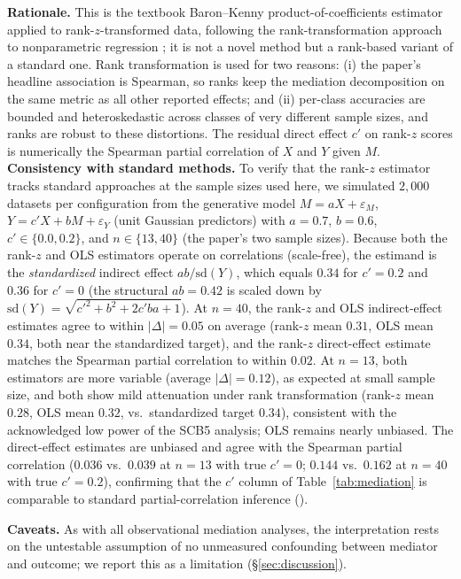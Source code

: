 \documentclass[a4paper,fleqn]{cas-sc}
\begin{document}
\textbf{Rationale.}
This is the textbook Baron--Kenny product-of-coefficients estimator \cite{baron1986moderator, mackinnon2002comparison} applied to rank-$z$-transformed data, following the rank-transformation approach to nonparametric regression \cite{conover1981rank}; it is not a novel method but a rank-based variant of a standard one. Rank transformation is used for two reasons: (i) the paper's headline association is Spearman, so ranks keep the mediation decomposition on the same metric as all other reported effects; and (ii) per-class accuracies are bounded and heteroskedastic across classes of very different sample sizes, and ranks are robust to these distortions. The residual direct effect $c'$ on rank-$z$ scores is numerically the Spearman partial correlation of $X$ and $Y$ given $M$.
\textbf{Consistency with standard methods.}
To verify that the rank-$z$ estimator tracks standard approaches at the sample sizes used here, we simulated $2{,}000$ datasets per configuration from the generative model $M = aX + \varepsilon_M$, $Y = c'X + bM + \varepsilon_Y$ (unit Gaussian predictors) with $a=0.7$, $b=0.6$, $c'\in\{0.0,0.2\}$, and $n\in\{13,40\}$ (the paper's two sample sizes). Because both the rank-$z$ and OLS estimators operate on correlations (scale-free), the estimand is the \emph{standardized} indirect effect $a b/\mathrm{sd}(Y)$, which equals $0.34$ for $c'=0.2$ and $0.36$ for $c'=0$ (the structural $a b=0.42$ is scaled down by $\mathrm{sd}(Y)=\sqrt{c'^2+b^2+2c'ba+1}$). At $n=40$, the rank-$z$ and OLS indirect-effect estimates agree to within $|\Delta|=0.05$ on average (rank-$z$ mean $0.31$, OLS mean $0.34$, both near the standardized target), and the rank-$z$ direct-effect estimate matches the Spearman partial correlation to within $0.02$. At $n=13$, both estimators are more variable (average $|\Delta|=0.12$), as expected at small sample size, and both show mild attenuation under rank transformation (rank-$z$ mean $0.28$, OLS mean $0.32$, vs.\ standardized target $0.34$), consistent with the acknowledged low power of the SCB5 analysis; OLS remains nearly unbiased. The direct-effect estimates are unbiased and agree with the Spearman partial correlation ($0.036$ vs.\ $0.039$ at $n=13$ with true $c'=0$; $0.144$ vs.\ $0.162$ at $n=40$ with true $c'=0.2$), confirming that the $c'$ column of Table~\ref{tab:mediation} is comparable to standard partial-correlation inference ().

\textbf{Caveats.}
As with all observational mediation analyses, the interpretation rests on the untestable assumption of no unmeasured confounding between mediator and outcome; we report this as a limitation (\S\ref{sec:discussion}).
\end{document}
